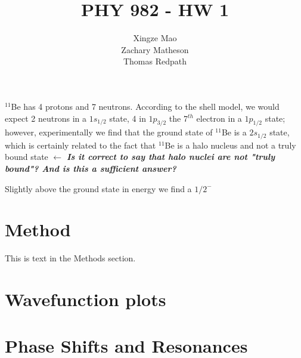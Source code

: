 \documentclass[]{scrartcl}
\title{PHY 982 - HW 1}
\author{Xingze Mao \\ Zachary Matheson \\ Thomas Redpath}
\date{}
\begin{document}
\maketitle

$^{11}$Be has 4 protons and 7 neutrons. According to the shell model, we would expect 2 neutrons in a $1s_{1/2}$ state, 4 in $1p_{3/2}$ the 7$^{th}$ electron in a $1p_{1/2}$ state; however, experimentally we find that the ground state of $^{11}$Be is a $2s_{1/2}$ state, which is certainly related to the fact that $^{11}$Be is a halo nucleus and not a truly bound state $\leftarrow$ \textit{\textbf{Is it correct to say that halo nuclei are not "truly bound"? And is this a sufficient answer?}}

Slightly above the ground state in energy we find a $1/2^-$ 

\section*{Method}\nonumber
This is text in the Methods section.\\

\section*{Wavefunction plots}

\begin{figure}

\end{figure}


\section*{Phase Shifts and Resonances}
\end{document}
